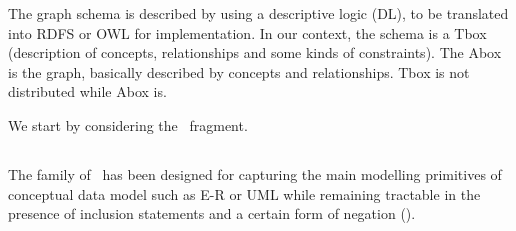 
The graph schema is described by using a descriptive logic  (DL), to be translated into RDFS or OWL for implementation.
In our context, the schema is a Tbox (description of concepts, relationships and some kinds of constraints).
The Abox is the graph, basically described by concepts and relationships.
Tbox is not distributed while Abox is.

We start by considering the \dl\ fragment.


\subsection{\dl}

   The family of \dl\ has been designed for capturing the main modelling primitives of conceptual data model such as E-R or UML while remaining  tractable in the presence of
inclusion statements and a certain form of negation (\cite{AMRRS12}).

